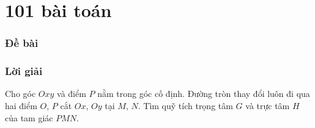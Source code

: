 \part{101 bài toán}

\setcounter{section}{0}

    \section{Đề bài}

    \newpage

    \section{Lời giải}

        \begin{problem}
            Cho góc \(Oxy\) và điểm \(P\) nằm trong góc cố định. Đường tròn thay đổi luôn đi qua hai điểm \(O\), \(P\) cắt \(Ox\), \(Oy\) tại \(M\), \(N\). Tìm quỹ tích trọng tâm \(G\) và trực tâm \(H\) của tam giác \(PMN\).
        \end{problem}

